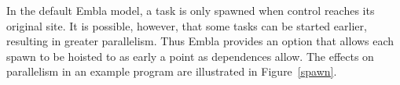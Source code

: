 In the default Embla model, a task is only spawned when control reaches its original site.
It is possible, however, that some tasks can be started earlier, resulting in greater parallelism.
Thus Embla provides an option that allows each spawn to be hoisted to as early a point as dependences allow.
The effects on parallelism in an example program are illustrated in Figure~\ref{spawn}.

